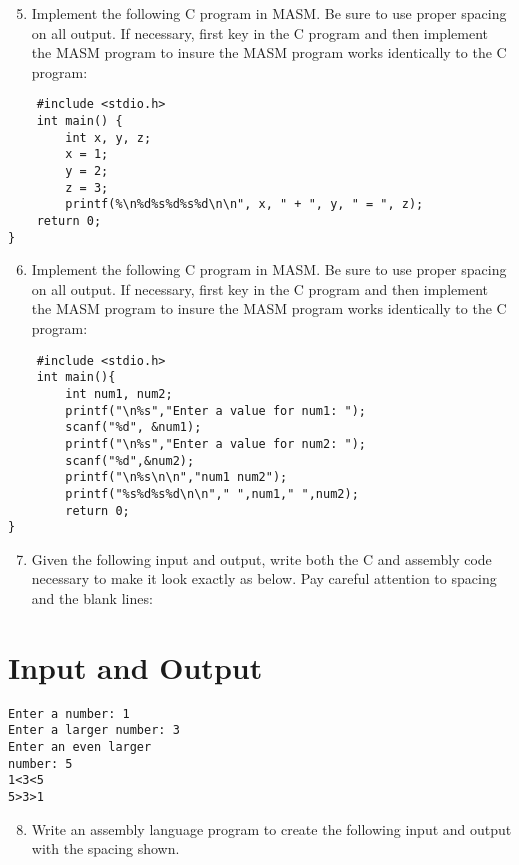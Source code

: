 \documentclass[10pt]{article}
\begin{document}
\begin{enumerate}
  \setcounter{enumi}{4}
  \item Implement the following C program in MASM. Be sure to use proper spacing on all output. If necessary, first key in the C program and then implement the MASM program to insure the MASM program works identically to the C program:
\end{enumerate}

\begin{verbatim}
    #include <stdio.h>
    int main() {
        int x, y, z;
        x = 1;
        y = 2;
        z = 3;
        printf(%\n%d%s%d%s%d\n\n", x, " + ", y, " = ", z);
    return 0;
}
\end{verbatim}

\begin{enumerate}
  \setcounter{enumi}{5}
  \item Implement the following C program in MASM. Be sure to use proper spacing on all output. If necessary, first key in the C program and then implement the MASM program to insure the MASM program works identically to the C program:
\end{enumerate}

\begin{verbatim}
    #include <stdio.h>
    int main(){
        int num1, num2;
        printf("\n%s","Enter a value for num1: ");
        scanf("%d", &num1);
        printf("\n%s","Enter a value for num2: ");
        scanf("%d",&num2);
        printf("\n%s\n\n","num1 num2");
        printf("%s%d%s%d\n\n"," ",num1," ",num2);
        return 0;
}
\end{verbatim}

\begin{enumerate}
  \setcounter{enumi}{6}
  \item Given the following input and output, write both the C and assembly code necessary to make it look exactly as below. Pay careful attention to spacing and the blank lines:
\end{enumerate}

\section*{Input and Output}
\begin{verbatim}
Enter a number: 1
Enter a larger number: 3
Enter an even larger
number: 5
1<3<5
5>3>1
\end{verbatim}

\begin{enumerate}
  \setcounter{enumi}{7}
  \item Write an assembly language program to create the following input and output with the spacing shown.
\end{enumerate}
\end{document}

